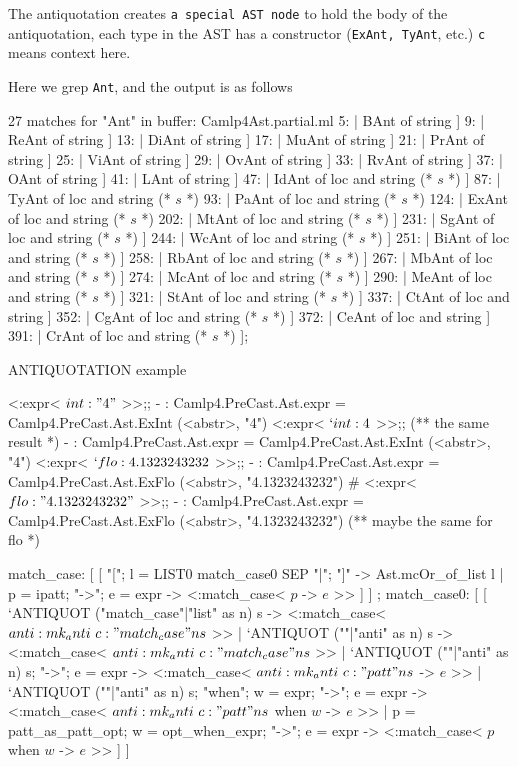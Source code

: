 The antiquotation creates \verb|a special AST node| to hold the body of the
antiquotation, each type in the AST has a constructor (\verb|ExAnt, TyAnt|,
etc.) \verb|c|  means context here.


Here we grep \verb|Ant|, and the output is as follows
\begin{bluetext}
  27 matches for "Ant" in buffer: Camlp4Ast.partial.ml
      5:    | BAnt of string ]
      9:    | ReAnt of string ]
     13:    | DiAnt of string ]
     17:    | MuAnt of string ]
     21:    | PrAnt of string ]
     25:    | ViAnt of string ]
     29:    | OvAnt of string ]
     33:    | RvAnt of string ]
     37:    | OAnt of string ]
     41:    | LAnt of string ]
     47:    | IdAnt of loc and string (* $s$ *) ]
     87:    | TyAnt of loc and string (* $s$ *)
     93:    | PaAnt of loc and string (* $s$ *)
    124:    | ExAnt of loc and string (* $s$ *)
    202:    | MtAnt of loc and string (* $s$ *) ]
    231:    | SgAnt of loc and string (* $s$ *) ]
    244:    | WcAnt of loc and string (* $s$ *) ]
    251:    | BiAnt of loc and string (* $s$ *) ]
    258:    | RbAnt of loc and string (* $s$ *) ]
    267:    | MbAnt of loc and string (* $s$ *) ]
    274:    | McAnt of loc and string (* $s$ *) ]
    290:    | MeAnt of loc and string (* $s$ *) ]
    321:    | StAnt of loc and string (* $s$ *) ]
    337:    | CtAnt of loc and string ]
    352:    | CgAnt of loc and string (* $s$ *) ]
    372:    | CeAnt of loc and string ]
    391:    | CrAnt of loc and string (* $s$ *) ];
\end{bluetext}




ANTIQUOTATION example 


\begin{alternate}
<:expr< $int: "4"$ >>;;
- : Camlp4.PreCast.Ast.expr = Camlp4.PreCast.Ast.ExInt (<abstr>, "4")
<:expr< $`int: 4$ >>;; (** the same result *)
- : Camlp4.PreCast.Ast.expr = Camlp4.PreCast.Ast.ExInt (<abstr>, "4")
<:expr< $`flo:4.1323243232$ >>;;
- : Camlp4.PreCast.Ast.expr = Camlp4.PreCast.Ast.ExFlo (<abstr>, "4.1323243232")
# <:expr< $flo:"4.1323243232"$ >>;;
- : Camlp4.PreCast.Ast.expr = Camlp4.PreCast.Ast.ExFlo (<abstr>, "4.1323243232")
(** maybe the same for flo *)
\end{alternate}



\begin{bluetext}
    match_case:
      [ [ "["; l = LIST0 match_case0 SEP "|"; "]" -> Ast.mcOr_of_list l
        | p = ipatt; "->"; e = expr -> <:match_case< $p$ -> $e$ >> ] ]
    ;
    match_case0:
      [ [ `ANTIQUOT ("match_case"|"list" as n) s ->
            <:match_case< $anti:mk_anti ~c:"match_case" n s$ >>
        | `ANTIQUOT (""|"anti" as n) s ->
            <:match_case< $anti:mk_anti ~c:"match_case" n s$ >>
        | `ANTIQUOT (""|"anti" as n) s; "->"; e = expr ->
            <:match_case< $anti:mk_anti ~c:"patt" n s$ -> $e$ >>
        | `ANTIQUOT (""|"anti" as n) s; "when"; w = expr; "->"; e = expr ->
            <:match_case< $anti:mk_anti ~c:"patt" n s$ when $w$ -> $e$ >>
        | p = patt_as_patt_opt; w = opt_when_expr; "->"; e = expr -> <:match_case< $p$ when $w$ -> $e$ >>
      ] ]
    \end{bluetext}
    
